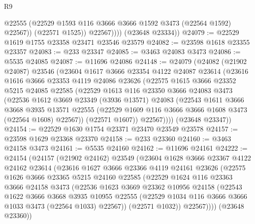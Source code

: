 \begin{lexlean}{R9}
\begin{coremodule}
                  @22555
                  (@22529 @1593 @116 @3666 @3666 @1592 @3473 (@22564 @1592) @22567))
                (@22571 @1525))
              @22567))))
      (@23648 @23334))
@24079 := @22529 @1619 @1755 @23358 @23471 @23546 @23579
@24082 := @23598 @1618 @23355 @23357
@24083 := @233 @23347
@24085 := @3463 @24083 @3473
@24086 := @5535 @24085
@24087 := @11696 @24086
@24148 := @24079
    (@24082
      (@21902 @24087)
      @23546
      (@23604
        @1617
        @3666
        @23354
        @4122
        @24087
        @23614
        (@23616
          @1616
          @3666
          @23353
          @4119
          @24086
          @23626
          (@22575
            @1615
            @3666
            @23352
            @5215
            @24085
            @22585
            (@22529
              @1613
              @116
              @23350
              @3666
              @24083
              @3473
              (@22536
                @1612
                @3669
                @23349
                (@3936 @13571)
                @24083
                (@22543
                  @1611
                  @3666
                  @3668
                  @3935
                  @13571
                  @22555
                  (@22529 @1609 @116 @3666 @3666 @1608 @3473 (@22564 @1608) @22567))
                (@22571 @1607))
              @22567))))
      (@23648 @23347))
@24154 := @22529 @1630 @1754 @23371 @23470 @23549 @23578
@24157 := @23598 @1629 @23368 @23370
@24158 := @233 @23360
@24160 := @3463 @24158 @3473
@24161 := @5535 @24160
@24162 := @11696 @24161
@24222 := @24154
    (@24157
      (@21902 @24162)
      @23549
      (@23604
        @1628
        @3666
        @23367
        @4122
        @24162
        @23614
        (@23616
          @1627
          @3666
          @23366
          @4119
          @24161
          @23626
          (@22575
            @1626
            @3666
            @23365
            @5215
            @24160
            @22585
            (@22529
              @1624
              @116
              @23363
              @3666
              @24158
              @3473
              (@22536
                @1623
                @3669
                @23362
                @10956
                @24158
                (@22543
                  @1622
                  @3666
                  @3668
                  @3935
                  @10955
                  @22555
                  (@22529 @1034 @116 @3666 @3666 @1033 @3473 (@22564 @1033) @22567))
                (@22571 @1032))
              @22567))))
      (@23648 @23360))

\end{coremodule}
\end{lexlean}
